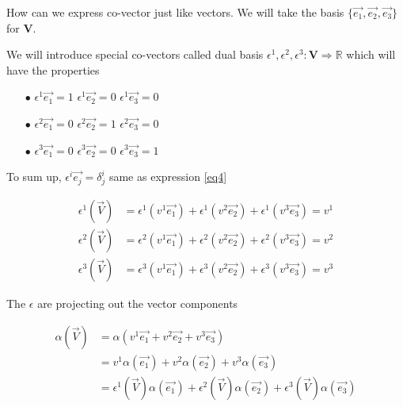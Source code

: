 \documentclass{article}
\begin{document}
	How can we express co-vector just like vectors. We will take the basis $\{\overrightarrow{e_{1}},\overrightarrow{e_{2}},\overrightarrow{e_{3}}\}$ for $\mathbf{V}$.
	
	We will introduce special co-vectors called dual basis $\epsilon^{1},\epsilon^{2},\epsilon^{3}:\mathbf{V}\Rightarrow \mathbb{R}$ which will have the properties
	
	\Large
	\begin{itemize}
		\item[$\bullet$] $\epsilon^{1}\overrightarrow{e_{1}}=1$ \hspace{25 pt} $\epsilon^{1}\overrightarrow{e_{2}}=0$ \hspace{25 pt} $\epsilon^{1}\overrightarrow{e_{3}}=0$
		\item[$\bullet$] $\epsilon^{2}\overrightarrow{e_{1}}=0$ \hspace{25 pt} $\epsilon^{2}\overrightarrow{e_{2}}=1$ \hspace{25 pt} $\epsilon^{2}\overrightarrow{e_{3}}=0$
		\item[$\bullet$] $\epsilon^{3}\overrightarrow{e_{1}}=0$ \hspace{25 pt} $\epsilon^{3}\overrightarrow{e_{2}}=0$ \hspace{25 pt} $\epsilon^{3}\overrightarrow{e_{3}}=1$ 
	\end{itemize}

	To sum up, $\epsilon^{i}\overrightarrow{e_{j}} = \delta^{i}_{j}$ same as expression \ref{eq4}
	
	\begin{align*}
		\epsilon^{1}(\overrightarrow{V}) &= \epsilon^{1}(v^{1}\overrightarrow{e_{1}}) + \epsilon^{1}(v^{2}\overrightarrow{e_{2}}) + \epsilon^{1}(v^{3}\overrightarrow{e_{3}}) = v^{1}\\
		\epsilon^{2}(\overrightarrow{V}) &= \epsilon^{2}(v^{1}\overrightarrow{e_{1}}) + \epsilon^{2}(v^{2}\overrightarrow{e_{2}}) + \epsilon^{2}(v^{3}\overrightarrow{e_{3}}) = v^{2}\\
		\epsilon^{3}(\overrightarrow{V}) &= \epsilon^{3}(v^{1}\overrightarrow{e_{1}}) + \epsilon^{3}(v^{2}\overrightarrow{e_{2}}) + \epsilon^{3}(v^{3}\overrightarrow{e_{3}}) = v^{3}
	\end{align*}

	The $\epsilon$ are projecting out the vector components
	
	\begin{align*}
		\alpha(\overrightarrow{V}) &= \alpha(v^{1}\overrightarrow{e_{1}} + v^{2}\overrightarrow{e_{2}} + v^{3}\overrightarrow{e_{3}})\\
								   &= v^{1}\alpha(\overrightarrow{e_{1}}) + v^{2}\alpha(\overrightarrow{e_{2}}) + v^{3}\alpha(\overrightarrow{e_{3}})\\
								   &= \epsilon^{1}(\overrightarrow{V})\alpha(\overrightarrow{e_{1}}) + \epsilon^{2}(\overrightarrow{V})\alpha(\overrightarrow{e_{2}}) + \epsilon^{3}(\overrightarrow{V})\alpha(\overrightarrow{e_{3}})
	\end{align*}
\end{document}
